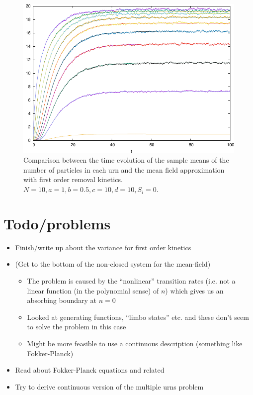 \documentclass[a4paper,11pt]{article}
\numberwithin{equation}{section}
\begin{document}
\begin{figure}[ht!]
    \centering
    \includegraphics{figures/firstorderrealisation}
    \caption{\label{fig:ex_first_order_real} Comparison between the time evolution of
the sample means of the number of particles in each urn and the mean field
approximation with first order removal kinetics.
\(N=10,a=1,b=0.5,c=10,d=10,S_i=0\).}
\end{figure}

\section{Todo/problems}
\begin{itemize}
    \item Finish/write up about the variance for first order kinetics
    \item (Get to the bottom of the non-closed system for the mean-field)
        \begin{itemize}
            \item The problem is caused by the ``nonlinear'' transition rates
                (i.e. not a linear function (in the polynomial sense) of \(n\)) which gives us an
                absorbing boundary at \(n=0\)
            \item Looked at generating functions, ``limbo states'' etc. and
                these don't seem to solve the problem in this case
            \item Might be more feasible to use a continuous description
                (something like Fokker-Planck)
        \end{itemize}
    \item Read about Fokker-Planck equations and related
    \item Try to derive continuous version of the multiple urns problem
\end{itemize}




\end{document}
